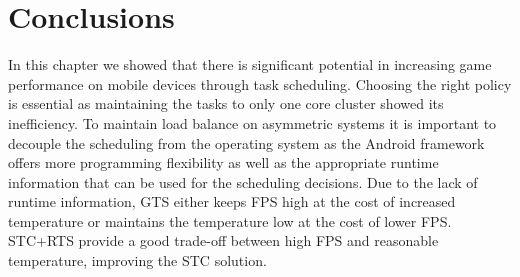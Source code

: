 
\section{Conclusions}

In this chapter we showed that there is significant potential in increasing game performance on mobile devices through task scheduling.
Choosing the right policy is essential as maintaining the tasks to only one core cluster showed its inefficiency.
To maintain load balance on asymmetric systems it is important to decouple the scheduling from the operating system as the Android framework offers more programming flexibility as well as the appropriate runtime information that can be used for the scheduling decisions.
Due to the lack of runtime information, GTS either keeps FPS high at the cost of increased temperature or maintains the temperature low at the cost of lower FPS.
STC+RTS provide a good trade-off between high FPS and reasonable temperature, improving the STC solution. 

